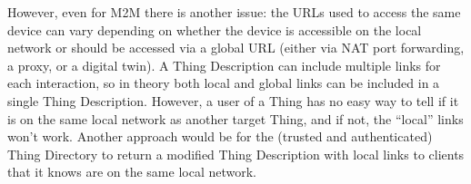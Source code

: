 However, even for M2M there is another issue: the URLs
used to access the same device can vary depending on whether the
device is accessible on the local network or should be accessed
via a global URL (either via NAT port forwarding, a proxy, or
a digital twin).
A Thing Description can include multiple links
for each interaction,
so in theory both local and global links
can be included in a single Thing Description.
However,
a user of a Thing has no easy way to tell if it is on
the same local network as another target Thing,
and if not, the ``local'' links won't work.
Another
approach would be for the (trusted and authenticated)
Thing Directory to return a modified
Thing Description with local links to clients that it knows 
are on the same local network.
